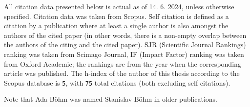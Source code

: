 All citation data presented below is actual as of 14. 6. 2024, unless otherwise
            specified. Citation data was taken from Scopus.
Self citation is defined as a citation by a publication where at least a single author is also amongst
the authors of the cited paper (in other words, there is a non-empty overlap between the authors of the citing and the cited paper).
SJR (Scientific Journal Rankings) ranking was taken from Scimago Journal,
IF (Impact Factor) ranking was taken from Oxford Academic;
the rankings are from the year when the corresponding article was published.
The h-index of the author of this thesis according to the Scopus database is \texttt{5},
with \texttt{75} total citations (both excluding self citations).

Note that Ada Böhm was named Stanislav Böhm in older publications.

